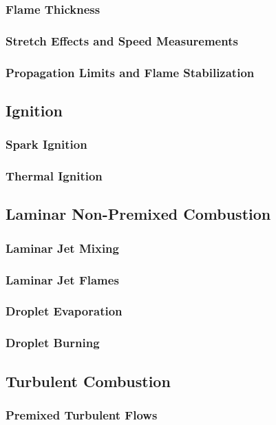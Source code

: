 \documentclass[11pt]{article}
\begin{document}
\subsubsection{Flame Thickness}
\subsubsection{Stretch Effects and Speed Measurements}
\subsubsection{Propagation Limits and Flame Stabilization}

\subsection{Ignition}
\subsubsection{Spark Ignition}
\subsubsection{Thermal Ignition}

\subsection{Laminar Non-Premixed Combustion}
\subsubsection{Laminar Jet Mixing}
\subsubsection{Laminar Jet Flames}
\subsubsection{Droplet Evaporation}
\subsubsection{Droplet Burning}

\subsection{Turbulent Combustion}
\subsubsection{Premixed Turbulent Flows}
\end{document}
